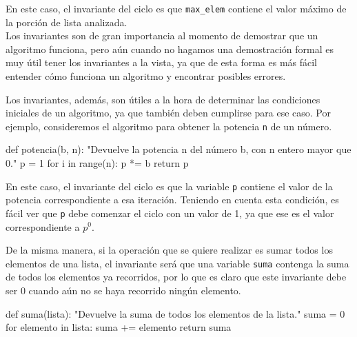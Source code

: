 En este caso, el invariante del ciclo es que \lstinline!max_elem! contiene el
valor máximo de la porción de lista analizada. \\

Los invariantes son de gran importancia al momento de demostrar que un
algoritmo funciona, pero aún cuando no hagamos una demostración formal es muy
útil tener los invariantes a la vista, ya que de esta forma es más fácil
entender cómo funciona un algoritmo y encontrar posibles errores.

Los invariantes, además, son útiles a la hora de determinar las condiciones
iniciales de un algoritmo, ya que también deben cumplirse para ese caso.  Por
ejemplo, consideremos el algoritmo para obtener la potencia \lstinline!n! de
un número.

\begin{codigo-python}
def potencia(b, n):
    "Devuelve la potencia n del número b, con n entero mayor que 0."
    p = 1
    for i in range(n):
        p *= b
    return p
\end{codigo-python}

En este caso, el invariante del ciclo es que la variable \lstinline!p!
contiene el valor de la potencia correspondiente a esa iteración. Teniendo en
cuenta esta condición, es fácil ver que \lstinline!p! debe comenzar el ciclo
con un valor de 1, ya que ese es el valor correspondiente a $p^0$.

De la misma manera, si la operación que se quiere realizar es sumar todos los
elementos de una lista, el invariante será que una variable \lstinline!suma!
contenga la suma de todos los elementos ya recorridos, por lo que es claro que
este invariante debe ser 0 cuando aún no se haya recorrido ningún elemento.

\begin{codigo-python}
def suma(lista):
    "Devuelve la suma de todos los elementos de la lista."
    suma = 0
    for elemento in lista:
        suma += elemento
    return suma
\end{codigo-python}



